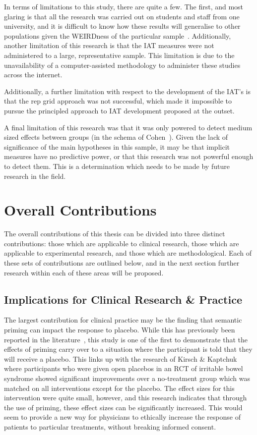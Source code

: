 In terms of limitations to this study, there are quite a few. The
first, and most glaring is that all the research was carried out on
students and staff from one university, and it is difficult to know
how these results will generalise to other populations given the
WEIRDness of the particular sample~\cite{henrich2010most}.
Additionally, another limitation of this research is that the IAT
measures were not administered to a large, representative sample. This
limitation is due to the unavailability of a computer-assisted
methodology to administer these studies across the internet.

Additionally, a further limitation with respect to the development of
the IAT's is that the rep grid approach was not successful, which made
it impossible to pursue the principled approach to IAT development
proposed at the outset.

A final limitation of this research was that it was only powered to
detect medium sized effects between groups (in the schema of
Cohen~\cite{cohen1988statistical}). Given the lack of significance of
the main hypotheses in this sample, it may be that implicit measures
have no predictive power, or that this research was not powerful
enough to detect them. This is a determination which needs to be made
by future research in the field.


\section{Overall Contributions}
\label{sec:over-contr}

The overall contributions of this thesis can be divided into three
distinct contributions: those which are applicable to clinical
research, those which are applicable to experimental research, and
those which are methodological. Each of these sets of contributions
are outlined below, and in the next section further research within
each of these areas will be proposed.

\subsection{Implications for Clinical Research \& Practice}
\label{sec:impl-clin-rese}

The largest contribution for clinical practice may be the finding that
semantic priming can impact the response to placebo. While this has
previously been reported in the
literature~\cite{Geers2005a,Jensen1991}, this study is one of the
first to demonstrate that the effects of priming carry over to a
situation where the participant is told that they will receive a
placebo. This links up with the research of Kirsch \&
Kaptchuk~\cite{kaptchuk2010placebos} where participants who were given
open placebos in an RCT of irritable bowel syndrome showed significant
improvements over a no-treatment group which was matched on all
interventions except for the placebo. The effect sizes for this
intervention were quite small, however, and this research indicates
that through the use of priming, these effect sizes can be
significantly increased. This would seem to provide a new way for
physicians to ethically increase the response of patients to
particular treatments, without breaking informed consent.

